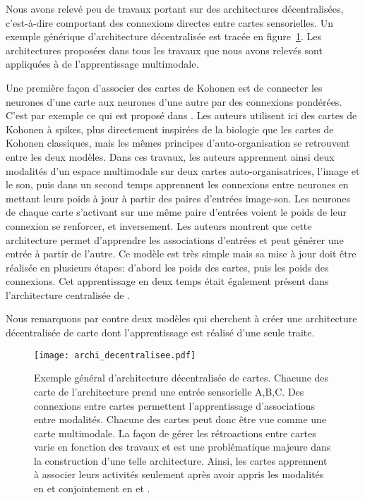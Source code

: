 \documentclass[../main]{subfiles}
\begin{document}
Nous avons relevé peu de travaux portant sur des architectures décentralisées, c'est-à-dire comportant des connexions directes entre cartes sensorielles. Un exemple générique d'architecture décentralisée est tracée en figure~\ref{fig:archi_decentralisee}. Les architectures proposées dans tous les travaux que nous avons relevés sont appliquées à de l'apprentissage multimodale.

Une première façon d'associer des cartes de Kohonen est de connecter les neurones d'une carte aux neurones d'une autre par des connexions pondérées. C'est par exemple ce qui est proposé dans \cite{khacef_brain-inspired_2020}. Les auteurs utilisent ici des cartes de Kohonen à spikes, plus directement inspirées de la biologie que les cartes de Kohonen classiques, mais les mêmes principes d'auto-organisation se retrouvent entre les deux modèles. Dans ces travaux, les auteurs apprennent ainsi deux modalités d'un espace multimodale sur deux cartes auto-organisatrices, l'image et le son, puis dans un second temps apprennent les connexions entre neurones en mettant leurs poids à jour à partir des paires d'entrées image-son. Les neurones de chaque carte s'activant sur une même paire d'entrées voient le poids de leur connexion se renforcer, et inversement.
Les auteurs montrent que cette architecture permet d'apprendre les associations d'entrées et peut générer une entrée à partir de l'autre. 
Ce modèle est très simple mais sa mise à jour doit être réalisée en plusieurs étapes: d'abord les poids des cartes, puis les poids des connexions. Cet apprentissage en deux temps était également présent dans l'architecture centralisée de \cite{dominey13}.

Nous remarquons par contre deux modèles qui cherchent à créer une architecture décentralisée de carte dont l'apprentissage est réalisé d'une seule traite. 

\begin{figure}
    \texttt{[image: archi\_decentralisee.pdf]}
    \caption{Exemple général d'architecture décentralisée de cartes. Chacune des carte de l'architecture prend une entrée sensorielle A,B,C. Des connexions entre cartes permettent l'apprentissage d'associations entre modalités. Chacune des cartes peut donc être vue comme une carte multimodale. La façon de gérer les rétroactions entre cartes varie en fonction des travaux et est une problématique majeure dans la construction d'une telle architecture. Ainsi, les cartes apprennent à associer leurs activités seulement après avoir appris les modalités en \cite{khacef_brain-inspired_2020} et conjointement en \cite{johnsson_associative_2009} et \cite{baheux_towards_2014}.\label{fig:archi_decentralisee}}
\end{figure}
\end{document}
